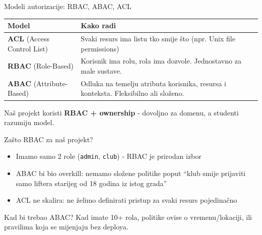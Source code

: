 \begin{frame}{Modeli autorizacije: RBAC, ABAC, ACL}
\begin{tabular}{@{}lp{8cm}@{}}
  \toprule
  \textbf{Model} & \textbf{Kako radi} \\
  \midrule
  \textbf{ACL} (Access Control List) & Svaki resurs ima listu tko smije što (npr. Unix file permissions) \\
  \midrule
  \textbf{RBAC} (Role-Based) & Korisnik ima rolu, rola ima dozvole. Jednostavno za male sustave. \\
  \midrule
  \textbf{ABAC} (Attribute-Based) & Odluka na temelju atributa korisnika, resursa i konteksta. Fleksibilno ali složeno. \\
  \bottomrule
\end{tabular}

\vspace{0.6em}
Naš projekt koristi \textbf{RBAC + ownership} - dovoljno za domenu, a studenti razumiju model.
\end{frame}

\begin{frame}{Zašto RBAC za naš projekt?}
\begin{itemize}
  \item Imamo samo 2 role (\texttt{admin}, \texttt{club}) - RBAC je prirodan izbor
  \item ABAC bi bio overkill: nemamo složene politike poput \enquote{klub smije prijaviti samo liftera starijeg od 18 godina iz istog grada}
  \item ACL ne skalira: ne želimo definirati pristup za svaki resurs pojedinačno
\end{itemize}

\vspace{0.6em}
\begin{block}{Kad bi trebao ABAC?}
Kad imate 10+ rola, politike ovise o vremenu/lokaciji, ili pravilima koja se mijenjaju bez deploya.
\end{block}
\end{frame}

